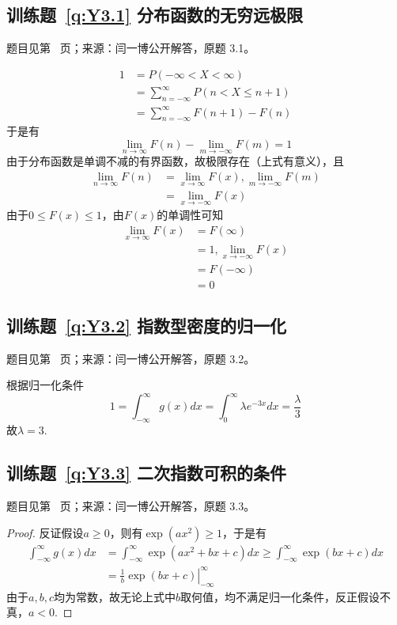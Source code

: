 \documentclass[UTF8,12pt,a4paper,fontset=fandol]{ctexbook}
\begin{document}
\subsection*{训练题~\ref{q:Y3.1} 分布函数的无穷远极限}\label{a:Y3.1}{\small 题目见第~\pageref{q:Y3.1} 页；来源：闫一博公开解答，原题 3.1。}
\begin{solve}
\[\begin{aligned}1&=P( - \infty  < X < \infty ) \\&= \sum\limits_{n =  - \infty }^\infty  {P(n < X \leqslant n + 1)}  \\&= \sum\limits_{n =  - \infty }^\infty  {F(n + 1) - F(n)} \end{aligned}\]
于是有
\[\mathop {\lim }\limits_{n \to \infty } F(n) - \mathop {\lim }\limits_{m \to  - \infty } F(m) = 1\]
由于分布函数是单调不减的有界函数，故极限存在（上式有意义），且
\[\begin{aligned}\mathop {\lim }\limits_{n \to   \infty } F\left( n \right) &= \mathop {\lim }\limits_{x \to   \infty } F(x),\mathop {\lim }\limits_{m \to  - \infty } F\left( m \right) \\&= \mathop {\lim }\limits_{x \to  - \infty } F(x)\end{aligned}\]
由于$0\leqslant F(x)\leqslant 1$，由$F(x)$的单调性可知
\[\begin{aligned}\mathop {\lim }\limits_{x \to \infty } F(x) &= F(\infty ) \\&= 1,\mathop {\lim }\limits_{x \to  - \infty } F(x) \\&= F( - \infty ) \\&= 0\end{aligned}\]
\end{solve}

\subsection*{训练题~\ref{q:Y3.2} 指数型密度的归一化}\label{a:Y3.2}{\small 题目见第~\pageref{q:Y3.2} 页；来源：闫一博公开解答，原题 3.2。}
\begin{solve}
根据归一化条件
\[1 = \int_{ - \infty }^\infty  {g(x)dx}  = \int_0^\infty  {\lambda {e^{ - 3x}}dx}  = \frac{\lambda }{3}\]
故$\lambda=3$.
\end{solve}

\subsection*{训练题~\ref{q:Y3.3} 二次指数可积的条件}\label{a:Y3.3}{\small 题目见第~\pageref{q:Y3.3} 页；来源：闫一博公开解答，原题 3.3。}
\begin{proof}
反证假设$a\geqslant 0$，则有$\exp(ax^2)\geqslant 1$，于是有
\[\begin{aligned}\int_{ - \infty }^\infty  {g(x)dx}  &= \int_{ - \infty }^\infty  {\exp (a{x^2} + bx + c)dx}  \geqslant \int_{ - \infty }^\infty  {\exp (bx + c)dx}  \\&= \left. {\frac{1}{b}\exp (bx + c)} \right|_{ - \infty }^\infty \end{aligned}\]
由于$a,b,c$均为常数，故无论上式中$b$取何值，均不满足归一化条件，反正假设不真，$a<0$.
\end{proof}
\end{document}
